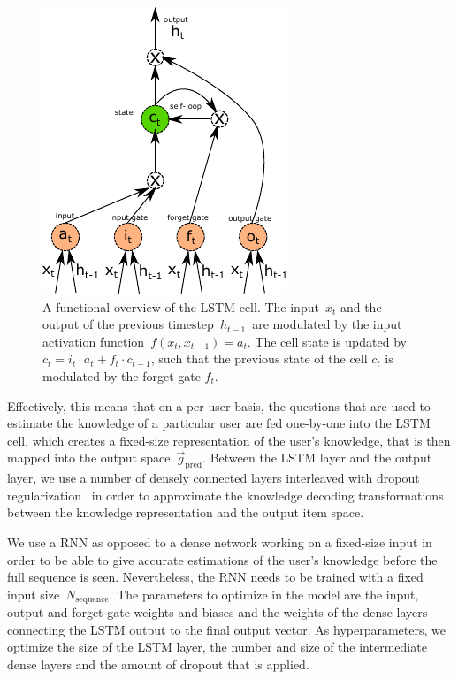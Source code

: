 \begin{figure}
\centering
\includegraphics[width=0.6\linewidth]{figures/lingvist/lstm.pdf}
\caption[The long short-term memory cell]{A functional overview of the LSTM cell. The input~$x_t$ and the output of the previous timestep~$h_{t-1}$~are modulated by the input activation function~$f(x_t, x_{t-1}) = a_t$. The cell state is updated by $c_t = i_t \cdot a_t + f_t \cdot c_{t-1}$, such that the previous state of the cell $c_t$ is modulated by the forget gate $f_t$.}
\label{fig:lu_example}
\end{figure} 

Effectively, this means that on a per-user basis, the questions that are used to estimate the knowledge of a particular user are fed one-by-one into the LSTM cell, which creates a fixed-size representation of the user's knowledge, that is then mapped into the output space~$\vec{g}_\mathrm{pred}$. Between the LSTM layer and the output layer, we use a number of densely connected layers interleaved with dropout regularization~\cite{srivastava2014dropout} in order to approximate the knowledge decoding transformations between the knowledge representation and the output item space.

We use a RNN as opposed to a dense network working on a fixed-size input in order to be able to give accurate estimations of the user's knowledge before the full sequence is seen. Nevertheless, the RNN needs to be trained with a fixed input size~$N_{\mathrm{sequence}}$. The parameters to optimize in the model are the input, output and forget gate weights and biases and the weights of the dense layers connecting the LSTM output to the final output vector. As hyperparameters, we optimize the size of the LSTM layer, the number and size of the intermediate dense layers and the amount of dropout that is applied.

